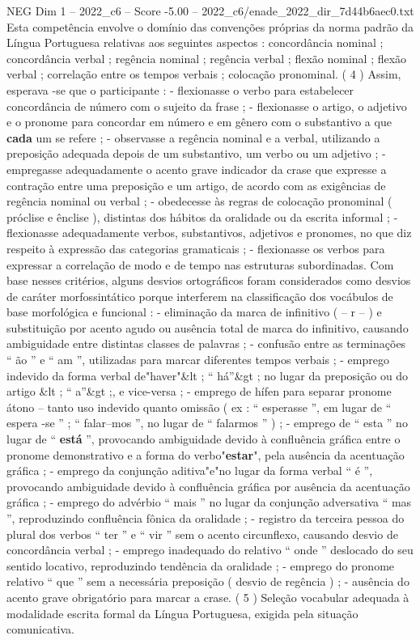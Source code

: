 \begin{textsample}{NEG Dim 1 – 2022\_c6 – Score -5.00 – 2022\_c6/enade\_2022\_dir\_7d44b6aec0.txt}
Esta competência envolve o domínio das convenções próprias da norma padrão da Língua Portuguesa relativas aos seguintes aspectos : concordância nominal ; concordância verbal ; regência nominal ; regência verbal ; flexão nominal ; flexão verbal ; correlação entre os tempos verbais ; colocação pronominal. ( 4 ) Assim, esperava -se que o participante : - flexionasse o verbo para estabelecer concordância de número com o sujeito da frase ; - flexionasse o artigo, o adjetivo e o pronome para concordar em número e em gênero com o substantivo a que \textbf{cada} um se refere ; - observasse a regência nominal e a verbal, utilizando a preposição adequada depois de um substantivo, um verbo ou um adjetivo ; - empregasse adequadamente o acento grave indicador da crase que expresse a contração entre uma preposição e um artigo, de acordo com as exigências de regência nominal ou verbal ; - obedecesse às regras de colocação pronominal ( próclise e ênclise ), distintas dos hábitos da oralidade ou da escrita informal ; - flexionasse adequadamente verbos, substantivos, adjetivos e pronomes, no que diz respeito à expressão das categorias gramaticais ; - flexionasse os verbos para expressar a correlação de modo e de tempo nas estruturas subordinadas.
Com base nesses critérios, alguns desvios ortográficos foram considerados como desvios de caráter morfossintático porque interferem na classificação dos vocábulos de base morfológica e funcional : - eliminação da marca de infinitivo ( – r – ) e substituição por acento agudo ou ausência total de marca do infinitivo, causando ambiguidade entre distintas classes de palavras ; - confusão entre as terminações “ ão ” e “ am ”, utilizadas para marcar diferentes tempos verbais ; - emprego indevido da forma verbal de"haver"\&lt ; “ há”\&gt ; no lugar da preposição ou do artigo \&lt ; “ a”\&gt ;, e vice-versa ; - emprego de hífen para separar pronome átono – tanto uso indevido quanto omissão ( ex : “ esperasse ”, em lugar de “ espera -se ” ; “ falar–mos ”, no lugar de “ falarmos ” ) ; - emprego de “ esta ” no lugar de “ \textbf{está} ”, provocando ambiguidade devido à confluência gráfica entre o pronome demonstrativo e a forma do verbo"\textbf{estar}", pela ausência da acentuação gráfica ; - emprego da conjunção aditiva"e"no lugar da forma verbal “ é ”, provocando ambiguidade devido à confluência gráfica por ausência da acentuação gráfica ; - emprego do advérbio “ mais ” no lugar da conjunção adversativa “ mas ”, reproduzindo confluência fônica da oralidade ; - registro da terceira pessoa do plural dos verbos “ ter ” e “ vir ” sem o acento circunflexo, causando desvio de concordância verbal ; - emprego inadequado do relativo “ onde ” deslocado do seu sentido locativo, reproduzindo tendência da oralidade ; - emprego do pronome relativo “ que ” sem a necessária preposição ( desvio de regência ) ; - ausência do acento grave obrigatório para marcar a crase. ( 5 ) Seleção vocabular adequada à modalidade escrita formal da Língua Portuguesa, exigida pela situação comunicativa.

\end{textsample}
